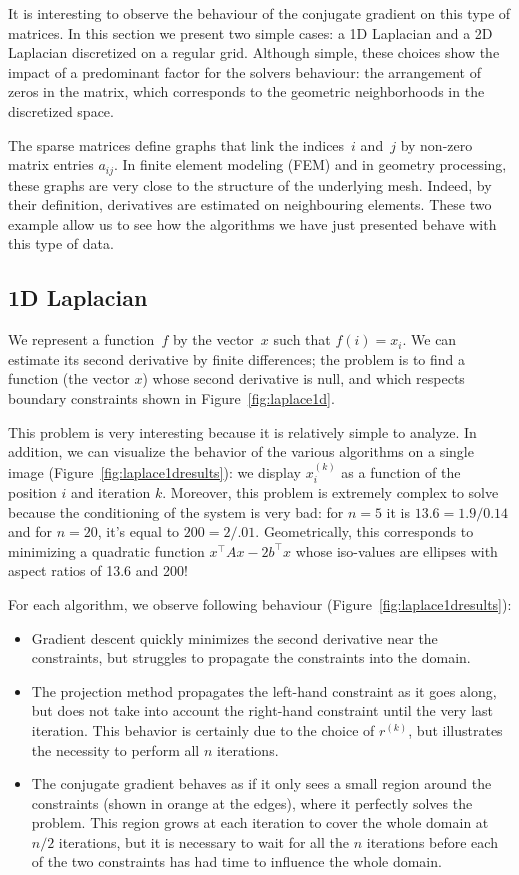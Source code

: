 \documentclass[notitlepage,oneside]{book}
\begin{document}
It is interesting to observe the behaviour of the conjugate gradient on this type of matrices.
In this section we present two simple cases: a 1D Laplacian and a 2D Laplacian discretized on a regular grid.
Although simple, these choices show the impact of a predominant factor for the solvers behaviour: the arrangement of zeros in the matrix, which corresponds to the geometric neighborhoods in the discretized space.

The sparse matrices define graphs that link the indices~$i$ and~$j$ by non-zero matrix entries $a_{ij}$.
In finite element modeling (FEM) and in geometry processing, these graphs are very close to the structure of the underlying mesh.
Indeed, by their definition, derivatives are estimated on neighbouring elements.
These two example allow us to see how the algorithms we have just presented behave with this type of data.

\subsection{1D Laplacian}

We represent a function~$f$ by the vector~$x$ such that $f(i) = x_i$.
We can estimate its second derivative by finite differences;
the problem is to find a function (the vector $x$) whose second derivative is null, and which respects boundary constraints shown in Figure~\ref{fig:laplace1d}.

This problem is very interesting because it is relatively simple to analyze.
In addition, we can visualize the behavior of the various algorithms on a single image (Figure~\ref{fig:laplace1dresults}): we display $x_i^{(k)}$ as a function of the position $i$ and iteration $k$.
Moreover, this problem is extremely complex to solve because the conditioning of the system is very bad: for $n=5$ it is $13.6= 1.9 / 0.14$ and for $n=20$, it's equal to $200 = 2/.01$.
Geometrically, this corresponds to minimizing a quadratic function $x^\top Ax-2b^\top x$ whose iso-values are ellipses with aspect ratios of 13.6 and 200!


For each algorithm, we observe following behaviour (Figure~\ref{fig:laplace1dresults}):
\begin{itemize}
\item Gradient descent quickly minimizes the second derivative near the constraints, but struggles to propagate the constraints into the domain.
\item The projection method propagates the left-hand constraint as it goes along, but does not take into account the right-hand constraint until the very last iteration.
This behavior is certainly due to the choice of $r^{(k)}$, but illustrates the necessity to perform all $n$ iterations.
\item The conjugate gradient behaves as if it only sees a small region around the constraints (shown in orange at the edges), where it perfectly solves the problem.
This region grows at each iteration to cover the whole domain at $n/2$ iterations, but it is necessary to wait for all the $n$ iterations before each of the two constraints has had time to influence the whole domain.
\end{itemize}
\end{document}
